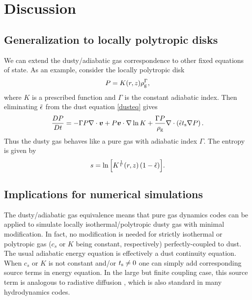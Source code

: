 \section{Discussion}\label{discussion}

\subsection{Generalization to locally polytropic disks}
We can extend the dusty/adiabatic gas correspondence to 
other fixed equations of state. As an example, consider the locally
polytropic disk 
\begin{align}
  P = K(r,z)\rho_\mathrm{g}^{\Gamma}, 
\end{align}
where $K$ is a prescribed function and $\Gamma$ is the constant
adiabatic index. Then eliminating $\tilde{\epsilon}$ from the dust equation
\ref{dusteq} gives 
\begin{align}\label{poly_energy}
  \frac{D P}{D t} = - \Gamma P\nabla\cdot\bm{v}  + P \bm{v}\cdot\nabla \ln{K}
  + \frac{\Gamma P}{\rho_\mathrm{g}}\nabla\cdot\left(\tilde{\epsilon}t_\mathrm{s}\nabla
  P\right).
\end{align}
Thus the dusty gas behaves like a pure gas with adiabatic index
$\Gamma$. The entropy is given by 
\begin{align}
  s = \ln{\left[K^\frac{1}{\Gamma}(r,z)\left(1 - \tilde{\epsilon}\right)\right]}.  
\end{align}

\subsection{Implications for numerical simulations}
The dusty/adiabatic gas equivalence means that pure
gas dynamics codes can be applied to simulate locally
isothermal/polytropic dusty gas with minimal modification. In fact, no
modification is needed  
for strictly isothermal or polytropic gas ($c_s$ or $K$ being
constant, respectively) perfectly-coupled to dust. The usual 
adiabatic energy equation is effectively a dust continuity
equation. When $c_s$ or $K$ is not constant and/or $t_\mathrm{s}\neq0$ one
can simply add corresponding source terms in energy equation. In the
large but finite coupling case, this source term is analogous to
radiative diffusion \citep{price15}, which is also standard in many
hydrodynamics codes.      


